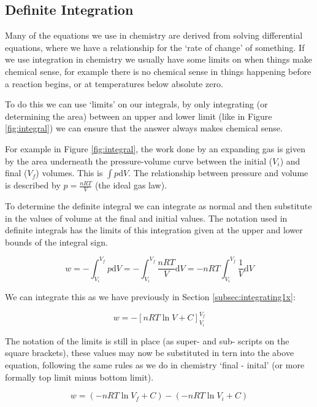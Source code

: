 \documentclass[
]{book}
\begin{document}
\hypertarget{subsec:definite}{%
\subsection{Definite Integration}\label{subsec:definite}}

Many of the equations we use in chemistry are derived from solving differential equations, where we have a relationship for the `rate of change' of something. If we use integration in chemistry we usually have some limits on when things make chemical sense, for example there is no chemical sense in things happening before a reaction begins, or at temperatures below absolute zero.

To do this we can use `limits' on our integrals, by only integrating (or determining the area) between an upper and lower limit (like in Figure \ref{fig:integral}) we can ensure that the answer always makes chemical sense.

For example in Figure \ref{fig:integral}, the work done by an expanding gas is given by the area underneath the pressure-volume curve between the initial (\(V_i\)) and final (\(V_f\)) volumes. This is \(\int p \textrm{d}V\). The relationship between pressure and volume is described by \(p=\tfrac{nRT}{V}\) (the ideal gas law).

To determine the definite integral we can integrate as normal and then substitute in the values of volume at the final and initial values. The notation used in definite integrals has the limits of this integration given at the upper and lower bounds of the integral sign.

\begin{equation*}
w= - \int_{V_i}^{V_f} p \textrm{d}V = - \int_{V_i}^{V_f} \frac{nRT}{V} \textrm{d}V = -nRT \int_{V_i}^{V_f} \frac{1}{V} \textrm{d}V
\end{equation*}

We can integrate this as we have previously in Section \ref{subsec:integrating1x}:

\begin{equation*}
w = -[nRT \ln V + C]_{V_i}^{V_f}
\end{equation*}

The notation of the limits is still in place (as super- and sub- scripts on the square brackets), these values may now be substituted in tern into the above equation, following the same rules as we do in chemistry `final - inital' (or more formally top limit minus bottom limit).

\begin{equation*}
w = (-nRT \ln V_f + C) - (-nRT \ln V_i + C)
\end{equation*}
\end{document}

